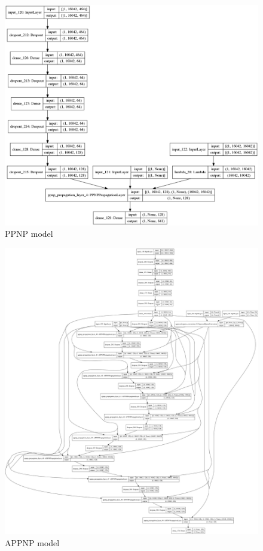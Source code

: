 \documentclass[10pt]{beamer}
\begin{document}
\begin{frame}
	\begin{figure}
		\includegraphics[height=0.9\textheight]{../../models/ppnp_model.png}
		\caption{PPNP model}
	\end{figure}
\end{frame}

\begin{frame}
	\begin{figure}
		\includegraphics[height=0.9\textheight]{../../models/appnp_model.png}
		\caption{APPNP model}
	\end{figure}
\end{frame}
\end{document}
